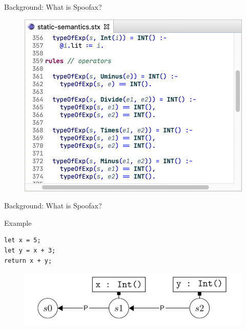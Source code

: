 \documentclass[aspectratio=43]{beamer}
\begin{document}
\begin{frame}[fragile]{Background: What is Spoofax?}
	\begin{figure}
		\includegraphics[width=0.8\linewidth]{img/semantics}
	\end{figure}
\end{frame}

\begin{frame}[fragile]{Background: What is Spoofax?}

\begin{exampleblock}{Example}
\begin{lstlisting}
let x = 5;
let y = x + 3;
return x + y;
\end{lstlisting}
\end{exampleblock}

\begin{figure}
	\includegraphics[width=0.7\linewidth]{img/screenshot005}
\end{figure}


\end{frame}
\end{document}
